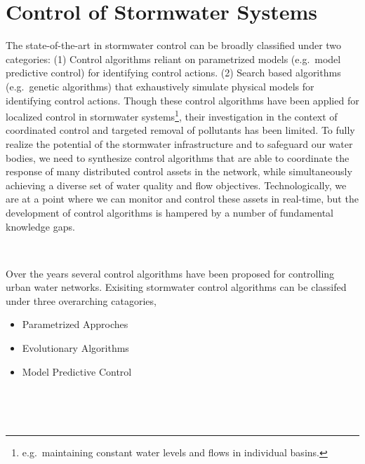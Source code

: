 \section{Control of Stormwater Systems} 
The state-of-the-art in stormwater control  can be broadly classified under two categories: (1) Control algorithms reliant on parametrized models (e.g.\ model predictive control) for identifying control actions. (2) Search based algorithms (e.g.\ genetic algorithms) that exhaustively simulate physical models for identifying control actions.
Though these control algorithms have been applied for localized control in stormwater systems\footnote{e.g.\ maintaining constant water levels and flows in individual basins.}, their investigation in the context of coordinated control and targeted removal of pollutants has been limited.
To fully realize the potential of the stormwater infrastructure and to safeguard our water bodies, we need to synthesize control algorithms that are able to coordinate the response of many distributed control assets in the network, while simultaneously achieving a diverse set of water quality and flow objectives. 
Technologically, we are at a point where we can monitor and control these assets in real-time, but the development of control algorithms is hampered by a number of fundamental knowledge gaps.

\

Over the years several control algorithms have been proposed for controlling urban water networks.
Exisiting stormwater control algorithms can be classifed under three overarching catagories,
\begin{itemize}
	\item Parametrized Approches 
	\item Evolutionary Algorithms
	\item Model Predictive Control
\end{itemize}

\


\

